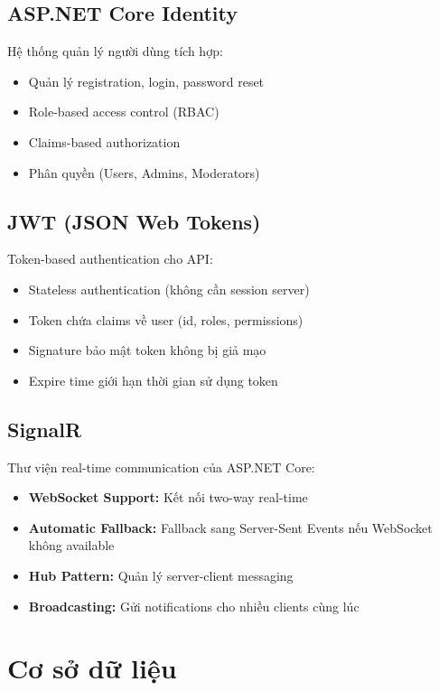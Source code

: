 \subsection{ASP.NET Core Identity}
Hệ thống quản lý người dùng tích hợp:

\begin{itemize}
    \item Quản lý registration, login, password reset
    \item Role-based access control (RBAC)
    \item Claims-based authorization
    \item Phân quyền (Users, Admins, Moderators)
\end{itemize}

\subsection{JWT (JSON Web Tokens)}
Token-based authentication cho API:

\begin{itemize}
    \item Stateless authentication (không cần session server)
    \item Token chứa claims về user (id, roles, permissions)
    \item Signature bảo mật token không bị giả mạo
    \item Expire time giới hạn thời gian sử dụng token
\end{itemize}

\subsection{SignalR}
Thư viện real-time communication của ASP.NET Core:

\begin{itemize}
    \item \textbf{WebSocket Support:} Kết nối two-way real-time
    \item \textbf{Automatic Fallback:} Fallback sang Server-Sent Events nếu WebSocket không available
    \item \textbf{Hub Pattern:} Quản lý server-client messaging
    \item \textbf{Broadcasting:} Gửi notifications cho nhiều clients cùng lúc
\end{itemize}

\section{Cơ sở dữ liệu}

